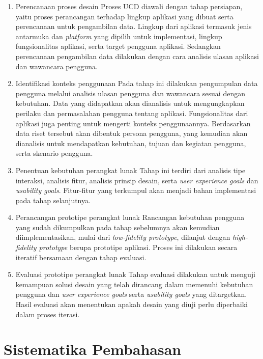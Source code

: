 \begin{enumerate}
  \item Perencanaan proses desain
  \subitem Proses UCD diawali dengan tahap persiapan, yaitu proses perancangan terhadap lingkup aplikasi yang dibuat serta perencanaan untuk pengambilan data. Lingkup dari aplikasi termasuk jenis antarmuka dan \textit{platform} yang dipilih untuk implementasi, lingkup fungsionalitas aplikasi, serta target pengguna aplikasi. Sedangkan perencanaan pengambilan data dilakukan dengan cara analisis ulasan aplikasi dan wawancara pengguna.

  \item Identifikasi konteks penggunaan
  \subitem Pada tahap ini dilakukan pengumpulan data pengguna melalui analisis ulasan pengguna dan wawancara sesuai dengan kebutuhan. Data yang didapatkan akan dianalisis untuk mengungkapkan perilaku dan permasalahan pengguna tentang aplikasi. Fungsionalitas dari aplikasi juga penting untuk mengerti konteks penggunaannya. Berdasarkan data riset tersebut akan dibentuk persona pengguna, yang kemudian akan dianalisis untuk mendapatkan kebutuhan, tujuan dan kegiatan pengguna, serta skenario pengguna.
   
  \item Penentuan kebutuhan perangkat lunak
  \subitem Tahap ini terdiri dari analisis tipe interaksi, analisis fitur, analisis prinsip desain, serta \textit{user experience goals} dan \textit{usability goals}. Fitur-fitur yang terkumpul akan menjadi bahan implementasi pada tahap selanjutnya.
  
  \item Perancangan prototipe perangkat lunak
  \subitem Rancangan kebutuhan pengguna yang sudah dikumpulkan pada tahap sebelumnya akan kemudian diimplementasikan, mulai dari \textit{low-fidelity prototype}, dilanjut dengan \textit{high-fidelity prototype} berupa prototipe aplikasi. Proses ini dilakukan secara iteratif bersamaan dengan tahap evaluasi.
  
  \item Evaluasi prototipe perangkat lunak
  \subitem Tahap evaluasi dilakukan untuk menguji kemampuan solusi desain yang telah dirancang dalam memenuhi kebutuhan pengguna dan \textit{user experience goals} serta \textit{usability goals} yang ditargetkan. Hasil evaluasi akan menentukan apakah desain yang diuji perlu diperbaiki dalam proses iterasi.
  
\end{enumerate}


\section{Sistematika Pembahasan}

